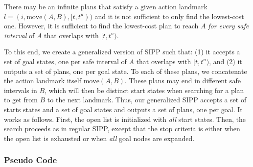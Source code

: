 \documentclass[letterpaper]{article} %
\newcommand{\ccbs}{\ac{CCBS}\xspace}
\newcommand{\ccbsds}{\ac{CCBS-DS}\xspace}
\newcommand{\sipp}{\ac{SIPP}\xspace}
\begin{document}
 There may be an infinite plans that satisfy a given action landmark $l=(i, \text{move}(A,B), [t,t^u))$ and it is not sufficient to only find the lowest-cost one. 
 However, it is sufficient to find the lowest-cost plan to reach $A$ \emph{for every safe interval} of $A$ that overlaps with $[t,t^u)$.  
 
 
 To this end, we create a generalized version of \sipp such that: 
 (1)  it accepts a set of goal states, one per safe interval of $A$ that overlaps with $[t,t^u)$, 
 and (2) it outputs a set of plans, one per goal state. 
 To each of these plans, we concatenate the  action landmark itself $\text{move}(A,B)$. 
 These plans may end in different safe intervals in $B$, which will then be distinct start states when searching for a plan to get from $B$ to the next landmark. 
Thus, our generalized \sipp accepts a set of starts states and a set of goal states and outputs a set of plans, one per goal. 
It works as follows. 
First, the open list is initialized with 
\emph{all} start states. 
Then, the search proceeds as in regular \sipp, except that the stop criteria is either when the open list is exhausted or when \emph{all} goal nodes are expanded. 




\subsubsection{Pseudo Code}
\end{document}
